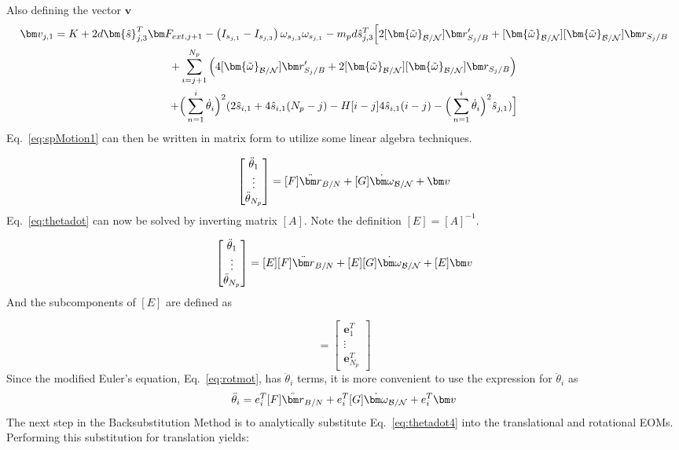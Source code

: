 Also defining the vector $\bm v$
\begin{multline}
	\bm v_{j,1} =  K + 2d\bm{\hat{s}}^{T}_{j,3}\bm F_{ext,j+1} - \left( I_{s_{j,1}} - I_{s_{j,3}}\right) \omega_{s_{j,3}} \omega_{s_{j,1}} - m_p d \hat{s}^{T}_{j,3}\Big[2[\bm{\tilde{\omega}}_{\cal B/N}]\bm r'_{S_{j}/B} + [\bm{\tilde{\omega}}_{\cal B/N}][\bm{\tilde{\omega}}_{\cal B/N}]\bm r_{S_{j}/B}\\
	+\sum^{N_p}_{i=j+1}\Big(4[\bm{\tilde{\omega}}_{\cal B/N}]\bm r'_{S_{j}/B} + 2[\bm{\tilde{\omega}}_{\cal B/N}][\bm{\tilde{\omega}}_{\cal B/N}]\bm r_{S_{j}/B} \Big) \\
	+ \Big( \sum^{i}_{n=1} \dot{\theta}_i \Big)^2 (2\hat{s}_{i,1}+4\hat{s}_{i,1}(N_p-j) -H[i-j] 4\hat{s}_{i,1}(i-j) - \Big( \sum^{i}_{n=1} \dot{\theta}_i\Big)^2 \hat{s}_{j,1} )\Big]
\end{multline}
Eq.~\eqref{eq:spMotion1} can then be written in matrix form to utilize some linear algebra techniques.

\begin{equation}
	[A]\begin{bmatrix}
		\ddot \theta_{1}\\
		\vdots \\
		\ddot \theta_{N_p}
	\end{bmatrix}
	= [F] \ddot{\bm r}_{B/N} + [G]\dot{\bm\omega}_{\cal B/N} + \bm v
	\label{eq:thetadot}
\end{equation}
Eq.~\eqref{eq:thetadot} can now be solved by inverting matrix $[A]$. Note the definition $[E] = [A]^{-1}$.

\begin{equation}
	\begin{bmatrix}
		\ddot \theta_{1}\\
		\vdots \\
		\ddot \theta_{N_p}
	\end{bmatrix}
	= [E][F] \ddot{\bm r}_{B/N} + [E][G]\dot{\bm\omega}_{\cal B/N} + [E]\bm v
	\label{eq:thetadot2}
\end{equation}
And the subcomponents of $[E]$ are defined as

\begin{equation}
	[E] = \begin{bmatrix}
		\bm e_{1}^T\\
		\vdots \\
		\bm e_{N_p}^T
	\end{bmatrix}
	\label{eq:E}
\end{equation}
Since the modified Euler's equation, Eq.~\eqref{eq:rotmot}, has $\ddot \theta_{i}$ terms, it is more convenient to use the expression for $\ddot \theta_i$ as
\begin{equation}
	\ddot \theta_{i}
	= e_{i}^T[F] \ddot{\bm r}_{B/N} + e_{i}^T[G]\dot{\bm\omega}_{\cal B/N} + e_{i}^T\bm v
	\label{eq:thetadot4}
\end{equation}
The next step in the Backsubstitution Method is to analytically substitute Eq.~\eqref{eq:thetadot4} into the translational and rotational EOMs. Performing this substitution for translation yields:

